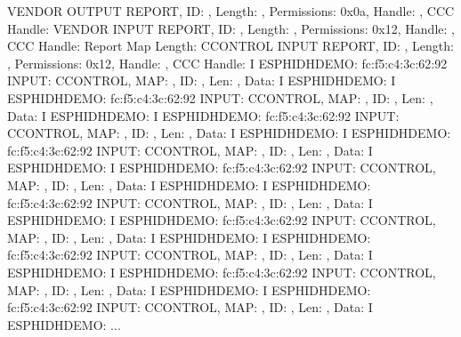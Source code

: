 \documentclass[a4paper,12pt,english]{sphinxmanual}
\begin{document}
{{\begin{sphinxVerbatim}[commandchars=\\\{\}]
      VENDOR  OUTPUT REPORT, ID:  , Length:   , Permissions: 0x0a, Handle:  , CCC Handle:   
      VENDOR   INPUT REPORT, ID:  , Length:   , Permissions: 0x12, Handle:  , CCC Handle:  
  Report Map Length: 
    CCONTROL   INPUT REPORT, ID:  , Length:   , Permissions: 0x12, Handle:  , CCC Handle:  
I  ESP\PYGZus{}HIDH\PYGZus{}DEMO: fc:f5:c4:3c:62:92 INPUT: CCONTROL, MAP:  , ID:   , Len: , Data:
I  ESP\PYGZus{}HIDH\PYGZus{}DEMO:   
I  ESP\PYGZus{}HIDH\PYGZus{}DEMO: fc:f5:c4:3c:62:92 INPUT: CCONTROL, MAP:  , ID:   , Len: , Data:
I  ESP\PYGZus{}HIDH\PYGZus{}DEMO:   
I  ESP\PYGZus{}HIDH\PYGZus{}DEMO: fc:f5:c4:3c:62:92 INPUT: CCONTROL, MAP:  , ID:   , Len: , Data:
I  ESP\PYGZus{}HIDH\PYGZus{}DEMO:   
I  ESP\PYGZus{}HIDH\PYGZus{}DEMO: fc:f5:c4:3c:62:92 INPUT: CCONTROL, MAP:  , ID:   , Len: , Data:
I  ESP\PYGZus{}HIDH\PYGZus{}DEMO:   
I  ESP\PYGZus{}HIDH\PYGZus{}DEMO: fc:f5:c4:3c:62:92 INPUT: CCONTROL, MAP:  , ID:   , Len: , Data:
I  ESP\PYGZus{}HIDH\PYGZus{}DEMO:   
I  ESP\PYGZus{}HIDH\PYGZus{}DEMO: fc:f5:c4:3c:62:92 INPUT: CCONTROL, MAP:  , ID:   , Len: , Data:
I  ESP\PYGZus{}HIDH\PYGZus{}DEMO:   
I  ESP\PYGZus{}HIDH\PYGZus{}DEMO: fc:f5:c4:3c:62:92 INPUT: CCONTROL, MAP:  , ID:   , Len: , Data:
I  ESP\PYGZus{}HIDH\PYGZus{}DEMO:   
I  ESP\PYGZus{}HIDH\PYGZus{}DEMO: fc:f5:c4:3c:62:92 INPUT: CCONTROL, MAP:  , ID:   , Len: , Data:
I  ESP\PYGZus{}HIDH\PYGZus{}DEMO:   
I  ESP\PYGZus{}HIDH\PYGZus{}DEMO: fc:f5:c4:3c:62:92 INPUT: CCONTROL, MAP:  , ID:   , Len: , Data:
I  ESP\PYGZus{}HIDH\PYGZus{}DEMO:   
I  ESP\PYGZus{}HIDH\PYGZus{}DEMO: fc:f5:c4:3c:62:92 INPUT: CCONTROL, MAP:  , ID:   , Len: , Data:
I  ESP\PYGZus{}HIDH\PYGZus{}DEMO:   
...
\end{sphinxVerbatim}


}}
\end{document}
